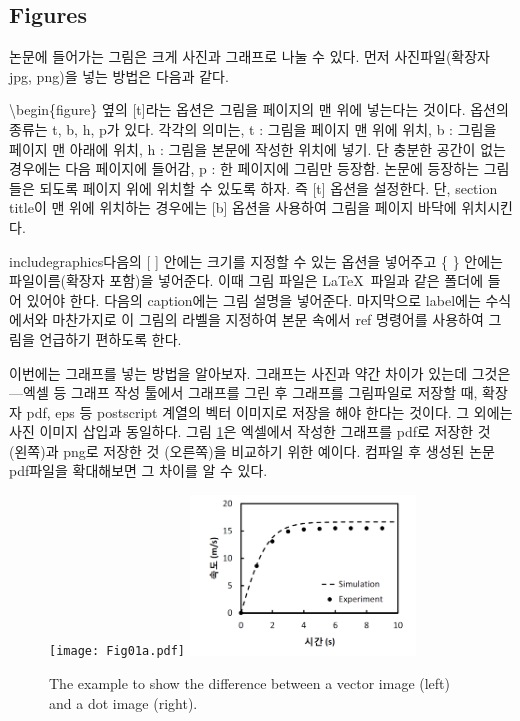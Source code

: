\documentclass[twoside,11pt]{gshs_thesis}
\begin{document}
\subsection{Figures}
논문에 들어가는 그림은 크게 사진과 그래프로 나눌 수 있다. 먼저 사진파일(확장자 jpg, png)을 넣는 방법은 다음과 같다.
\begin{center}
\end{center}
{\textbackslash}begin\{figure\} 옆의 [t]라는 옵션은 그림을 페이지의 맨 위에 넣는다는 것이다. 옵션의 종류는 t, b, h, p가 있다. 각각의 의미는, t : 그림을 페이지 맨 위에 위치, b : 그림을 페이지 맨 아래에 위치, h : 그림을 본문에 작성한 위치에 넣기. 단 충분한 공간이 없는 경우에는 다음 페이지에 들어감, p : 한 페이지에 그림만 등장함. 논문에 등장하는 그림들은 되도록 페이지 위에 위치할 수 있도록 하자. 즉 [t] 옵션을 설정한다. 단, section title이 맨 위에 위치하는 경우에는 [b] 옵션을 사용하여 그림을 페이지 바닥에 위치시킨다.

includegraphics다음의 [ ] 안에는 크기를 지정할 수 있는 옵션을 넣어주고 \{ \} 안에는 파일이름(확장자 포함)을 넣어준다. 이때 그림 파일은 \LaTeX\ 파일과 같은 폴더에 들어 있어야 한다. 다음의 caption에는 그림 설명을 넣어준다. 마지막으로 label에는 수식에서와 마찬가지로 이 그림의 라벨을 지정하여 본문 속에서 ref 명령어를 사용하여 그림을 언급하기 편하도록 한다.

이번에는 그래프를 넣는 방법을 알아보자. 그래프는 사진과 약간 차이가 있는데 그것은---엑셀 등 그래프 작성 툴에서 그래프를 그린 후 그래프를 그림파일로 저장할 때, 확장자 pdf, eps 등 postscript 계열의 벡터 이미지로 저장을 해야 한다는 것이다. 그 외에는 사진 이미지 삽입과 동일하다. 그림 \ref{Fig01}은 엑셀에서 작성한 그래프를 pdf로 저장한 것 (왼쪽)과 png로 저장한 것 (오른쪽)을 비교하기 위한 예이다. 컴파일 후 생성된 논문 pdf파일을 확대해보면 그 차이를 알 수 있다.

\begin{figure}[t]
\begin{center}
\texttt{[image: Fig01a.pdf]}
\includegraphics[width=6cm]{Fig01b.png}
\caption{The example to show the difference between a vector image (left) and a dot image (right).} \label{Fig01}
\end{center}
\end{figure}
\end{document}
